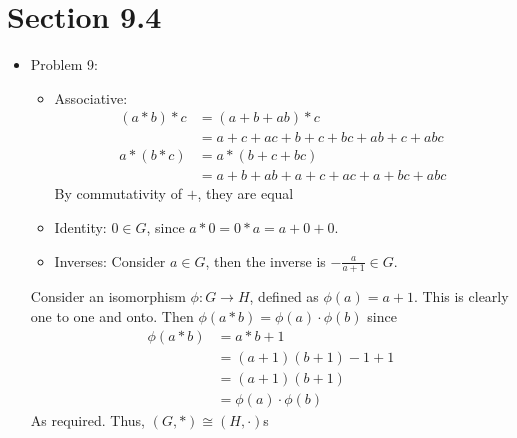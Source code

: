 \documentclass[a4paper,12pt]{extarticle}
\theoremstyle{definition}
\begin{document}
\section{Section 9.4}
\begin{itemize}
    \item Problem 9: \begin{itemize}
        \item Associative: \begin{align*}
        (a*b)*c&=(a+b+ab)*c\\
        &=a+c+ac+b+c+bc+ab+c+abc\\
        a*(b*c)&=a*(b+c+bc)\\
        &=a+b+ab+a+c+ac+a+bc+abc
        \end{align*} By commutativity of $+$, they are equal
        \item Identity: $0\in G$, since $a*0=0*a=a+0+0$.
        \item Inverses: Consider $a\in G$, then the inverse is $-\frac{a}{a+1}\in G$.
    \end{itemize}
    Consider an isomorphism $\phi: G\to H$, defined as $\phi(a)=a+1$. This is clearly one to one and onto. Then $\phi(a*b)=\phi(a)\cdot\phi(b)$ since \begin{align*}
        \phi(a*b)&=a*b+1\\
        &=(a+1)(b+1)-1+1\\
        &=(a+1)(b+1)\\
        &=\phi(a)\cdot\phi(b)
    \end{align*} As required. Thus, $(G,*)\cong(H,\cdot)$s
\end{itemize}
\end{document}
